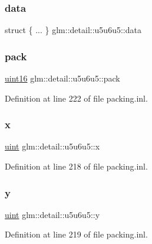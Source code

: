 \subsubsection{\texorpdfstring{data}{data}}
{\footnotesize\ttfamily struct \{ ... \}   glm\+::detail\+::u5u6u5\+::data}

\mbox{\label{unionglm_1_1detail_1_1u5u6u5_a5ea89c1a491b7e1442cad93d92628b2e}} 
\subsubsection{\texorpdfstring{pack}{pack}}
{\footnotesize\ttfamily \mbox{\hyperlink{namespaceglm_1_1detail_a47b2a7d006d187338e8031a352d1ce56}{uint16}} glm\+::detail\+::u5u6u5\+::pack}



Definition at line 222 of file packing.\+inl.

\mbox{\label{unionglm_1_1detail_1_1u5u6u5_ae265d637dd0e4430f3e96a509e19fb06}} 
\subsubsection{\texorpdfstring{x}{x}}
{\footnotesize\ttfamily \mbox{\hyperlink{group__core__precision_ga4fd29415871152bfb5abd588334147c8}{uint}} glm\+::detail\+::u5u6u5\+::x}



Definition at line 218 of file packing.\+inl.

\mbox{\label{unionglm_1_1detail_1_1u5u6u5_ab60581ca18c5faa107d8cbd5cfa946c9}} 
\subsubsection{\texorpdfstring{y}{y}}
{\footnotesize\ttfamily \mbox{\hyperlink{group__core__precision_ga4fd29415871152bfb5abd588334147c8}{uint}} glm\+::detail\+::u5u6u5\+::y}



Definition at line 219 of file packing.\+inl.

